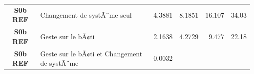 \documentclass[]{article}
\begin{document}
\begin{longtable}[]{@{}clrrrr@{}}
\begin{minipage}[t]{0.17\columnwidth}\centering\strut
\textbf{S0b REF}\strut
\end{minipage} & \begin{minipage}[t]{0.29\columnwidth}\raggedright\strut
Changement de systÃ¨me seul\strut
\end{minipage} & \begin{minipage}[t]{0.09\columnwidth}\raggedleft\strut
4.3881\strut
\end{minipage} & \begin{minipage}[t]{0.09\columnwidth}\raggedleft\strut
8.1851\strut
\end{minipage} & \begin{minipage}[t]{0.09\columnwidth}\raggedleft\strut
16.107\strut
\end{minipage} & \begin{minipage}[t]{0.09\columnwidth}\raggedleft\strut
34.03\strut
\end{minipage}\tabularnewline
\begin{minipage}[t]{0.17\columnwidth}\centering\strut
\textbf{S0b REF}\strut
\end{minipage} & \begin{minipage}[t]{0.29\columnwidth}\raggedright\strut
Geste sur le bÃ¢ti\strut
\end{minipage} & \begin{minipage}[t]{0.09\columnwidth}\raggedleft\strut
2.1638\strut
\end{minipage} & \begin{minipage}[t]{0.09\columnwidth}\raggedleft\strut
4.2729\strut
\end{minipage} & \begin{minipage}[t]{0.09\columnwidth}\raggedleft\strut
9.477\strut
\end{minipage} & \begin{minipage}[t]{0.09\columnwidth}\raggedleft\strut
22.18\strut
\end{minipage}\tabularnewline
\begin{minipage}[t]{0.17\columnwidth}\centering\strut
\textbf{S0b REF}\strut
\end{minipage} & \begin{minipage}[t]{0.29\columnwidth}\raggedright\strut
Geste sur le bÃ¢ti et Changement de systÃ¨me\strut
\end{minipage} & \begin{minipage}[t]{0.09\columnwidth}\raggedleft\strut
0.0032\strut
\end{minipage} & \begin{minipage}[t]{0.09\columnwidth}\raggedleft\strut

\end{minipage}
\end{longtable}
\end{document}
